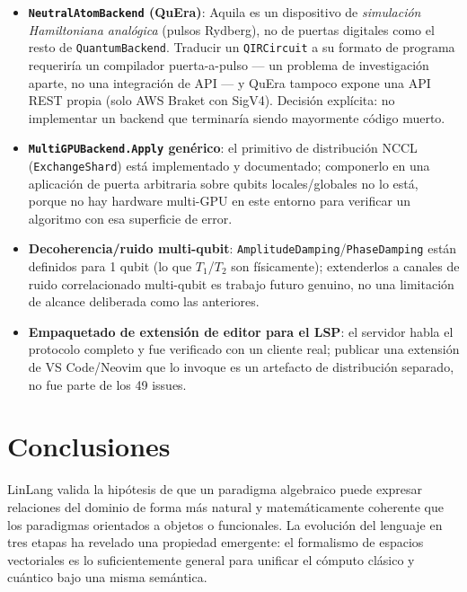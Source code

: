 \documentclass[12pt, a4paper, openany]{report}
\theoremstyle{definition}
\begin{document}
\begin{itemize}
  \item \textbf{\texttt{NeutralAtomBackend} (QuEra)}: Aquila es un dispositivo de \emph{simulación Hamiltoniana analógica} (pulsos Rydberg), no de puertas digitales como el resto de \texttt{QuantumBackend}. Traducir un \texttt{QIRCircuit} a su formato de programa requeriría un compilador puerta-a-pulso — un problema de investigación aparte, no una integración de API — y QuEra tampoco expone una API REST propia (solo AWS Braket con SigV4). Decisión explícita: no implementar un backend que terminaría siendo mayormente código muerto.
  \item \textbf{\texttt{MultiGPUBackend.Apply} genérico}: el primitivo de distribución NCCL (\texttt{ExchangeShard}) está implementado y documentado; componerlo en una aplicación de puerta arbitraria sobre qubits locales/globales no lo está, porque no hay hardware multi-GPU en este entorno para verificar un algoritmo con esa superficie de error.
  \item \textbf{Decoherencia/ruido multi-qubit}: \texttt{AmplitudeDamping}/\texttt{PhaseDamping} están definidos para 1 qubit (lo que $T_1$/$T_2$ son físicamente); extenderlos a canales de ruido correlacionado multi-qubit es trabajo futuro genuino, no una limitación de alcance deliberada como las anteriores.
  \item \textbf{Empaquetado de extensión de editor para el LSP}: el servidor habla el protocolo completo y fue verificado con un cliente real; publicar una extensión de VS Code/Neovim que lo invoque es un artefacto de distribución separado, no fue parte de los 49 issues.
\end{itemize}

\chapter{Conclusiones}
\label{ch:conclusiones}

LinLang valida la hipótesis de que un paradigma algebraico puede expresar relaciones del dominio de forma más natural y matemáticamente coherente que los paradigmas orientados a objetos o funcionales. La evolución del lenguaje en tres etapas ha revelado una propiedad emergente: el formalismo de espacios vectoriales es lo suficientemente general para unificar el cómputo clásico y cuántico bajo una misma semántica.
\end{document}
